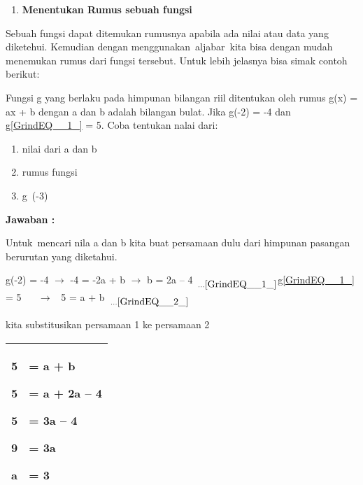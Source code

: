 \documentclass[11pt,fleqn]{book} %
\begin{document}
\noindent 

\begin{enumerate}
\item  \textbf{ Menentukan Rumus sebuah fungsi}
\end{enumerate}

\noindent 

\noindent Sebuah fungsi dapat ditemukan rumusnya apabila ada nilai atau data yang diketehui. Kemudian dengan menggunakan~aljabar~kita bisa dengan mudah menemukan rumus dari fungsi tersebut. Untuk lebih jelasnya bisa simak contoh berikut:

\noindent 

\noindent Fungsi g yang berlaku pada himpunan bilangan riil ditentukan oleh rumus g(x) = ax + b dengan a dan b adalah bilangan bulat. Jika g(-2) = -4 dan g\eqref{GrindEQ__1_} = 5. Coba tentukan nalai dari:

\noindent 

\begin{enumerate}
\item  nilai dari a dan b

\item  rumus fungsi

\item  g~(-3)
\end{enumerate}

\noindent 

\textbf{Jawaban :}

\textbf{}

\noindent Untuk~mencari nila a dan b kita buat persamaan dulu dari himpunan pasangan berurutan yang diketahui.

\noindent g(-2) = -4 $\mathrm{\to}$ -4 = -2a + b $\mathrm{\to}$ b = 2a -- 4~${}_{{\dots}\eqref{GrindEQ__1_}}$g\eqref{GrindEQ__1_} = 5 ~ ~$\mathrm{\to}$ ~5 = a + b~${}_{{\dots}\eqref{GrindEQ__2_}}$

\noindent kita substitusikan persamaan 1 ke persamaan 2

\noindent 

\begin{tabular}{|p{0.1in}|p{1.0in}|} \hline 
5 \par 5 \par 5 \par 9 \par a & = a + b \par = a + 2a -- 4 \par = 3a -- 4 \par = 3a \par = 3 \\ \hline 
\end{tabular}
\end{document}
